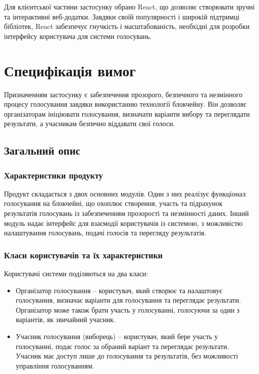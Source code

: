 \documentclass[14pt]{extreport}
\begin{document}
  Для клієнтської частини застосунку обрано React, що дозволяє створювати зручні та інтерактивні веб-додатки. Завдяки своїй популярності і широкій підтримці бібліотек, React забезпечує гнучкість і масштабованість, необхідні для розробки інтерфейсу користувача для системи голосувань.
  
  \section{Специфікація вимог}
  
  Призначенням застосунку є забезпечення прозорого, безпечного та незмінного процесу голосування завдяки використанню технології блокчейну. Він дозволяє організаторам ініціювати голосування, визначати варіанти вибору та переглядати результати, а учасникам безпечно віддавати свої голоси.
  
  
  \subsection{Загальний опис}
  \subsubsection{Характеристики продукту}  
  Продукт складається з двох основних модулів. Один з них реалізує функціонал голосування на блокчейні, що охоплює створення, участь та підрахунок результатів голосувань із забезпеченням прозорості та незмінності даних. Інший модуль надає інтерфейс для взаємодії користувачів із системою, з можливістю налаштування голосувань, подачі голосів та перегляду результатів.
  
  \subsubsection{Класи користувачів та їх характеристики}
  Користувачі системи поділяються на два класи:
  \begin{itemize}
    \item Організатор голосування – користувач, який створює та налаштовує голосування, визначає варіанти для голосування та переглядає результати. Організатор може також брати участь у голосуванні, голосуючи за один з варіантів, як звичайний учасник.
    \item Учасник голосування (виборець) – користувач, який бере участь у голосуванні, подає голос за обраний варіант та переглядає результати. Учасник має доступ лише до голосування та результатів, без можливості управління голосуванням.
  \end{itemize}
  
\end{document}
